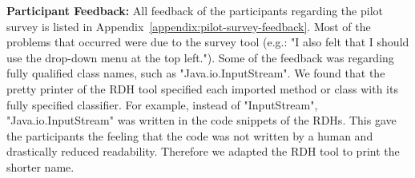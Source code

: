 \documentclass[%
class=scrreprt,
chapterprefix=false,%
open=right,%
twoside=false,%
paper=a4,%
logofile={Logo\_zentral\_farbig\_EN.png},%
thesistype=master,%
UKenglish,%
]{se2thesis}
\theoremstyle{definition}
\begin{document}
	\textbf{Participant Feedback:}
	All feedback of the participants regarding the pilot survey is listed in Appendix~\ref{appendix:pilot-survey-feedback}.
	Most of the problems that occurred were due to the survey tool (e.g.: "I also felt that I should use the drop-down menu at the top left.").
	Some of the feedback was regarding fully qualified class names, such as "Java.io.InputStream". We found that the pretty printer of the RDH tool specified each imported method or class with its fully specified classifier. For example, instead of "InputStream", "Java.io.InputStream" was written in the code snippets of the RDHs. This gave the participants the feeling that the code was not written by a human and drastically reduced readability. Therefore we adapted the RDH tool to print the shorter name.
	
\end{document}
